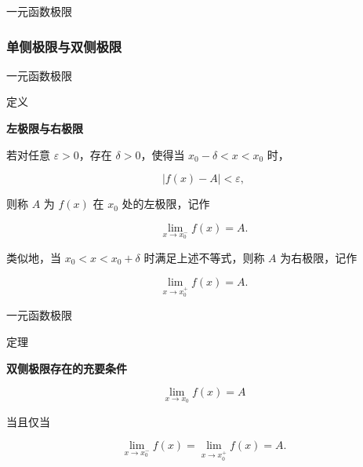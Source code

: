 \documentclass[aspectratio=169,10pt,fontset=fandol]{ctexbeamer}
\begin{document}
\begin{frame}[t,fragile]{一元函数极限}
\normalsize
{\normalsize
\subsubsection*{单侧极限与双侧极限}




}
\end{frame}
\begin{frame}[t,fragile]{一元函数极限}
\normalsize
\begin{block}{定义}
{\normalsize
\textbf{左极限与右极限}\par


若对任意 \(\varepsilon>0\)，存在 \(\delta>0\)，使得当 \(x_0-\delta<x<x_0\) 时，

\[

|f(x)-A|<\varepsilon,

\]

则称 \(A\) 为 \(f(x)\) 在 \(x_0\) 处的左极限，记作

\[

\lim_{x\to x_0^-}f(x)=A.

\]

类似地，当 \(x_0<x<x_0+\delta\) 时满足上述不等式，则称 \(A\) 为右极限，记作

\[

\lim_{x\to x_0^+}f(x)=A.

\]


}
\end{block}
\end{frame}
\begin{frame}[t,fragile]{一元函数极限}
\normalsize
\begin{block}{定理}
{\normalsize
\textbf{双侧极限存在的充要条件}\par


\[

\lim_{x\to x_0}f(x)=A

\]

当且仅当

\[

\lim_{x\to x_0^-}f(x)=\lim_{x\to x_0^+}f(x)=A.

\]


}
\end{block}
\end{frame}
\end{document}

